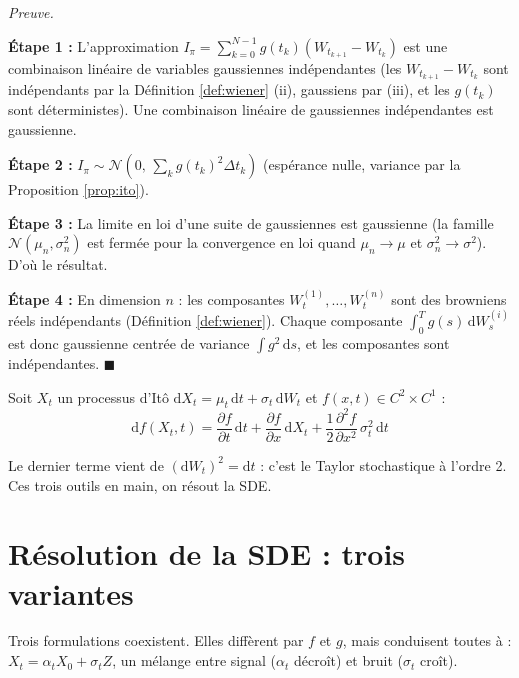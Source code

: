 \documentclass[12pt]{article}
\renewcommand{\qedsymbol}{$\blacksquare$}
\renewenvironment{proof}[1][\proofname]{%
  \par\medskip\noindent
  \textit{\color{proofgray}#1.}\enspace\ignorespaces
}{\hfill\qedsymbol\par\medskip}
\renewcommand{\proofname}{Preuve}
\begin{document}
  \begin{proof}







\textbf{Étape 1 :} L'approximation $I_\pi = \sum_{k=0}^{N-1} g(t_k)(W_{t_{k+1}} - W_{t_k})$ est une combinaison linéaire de variables gaussiennes indépendantes (les $W_{t_{k+1}} - W_{t_k}$ sont indépendants par la Définition \ref{def:wiener} (ii), gaussiens par (iii), et les $g(t_k)$ sont déterministes). Une combinaison linéaire de gaussiennes indépendantes est gaussienne.

\textbf{Étape 2 :} $I_\pi \sim \mathcal{N}(0,\, \sum_k g(t_k)^2 \Delta t_k)$ (espérance nulle, variance par la Proposition \ref{prop:ito}).

\textbf{Étape 3 :} La limite en loi d'une suite de gaussiennes est gaussienne (la famille $\mathcal{N}(\mu_n, \sigma_n^2)$ est fermée pour la convergence en loi quand $\mu_n \to \mu$ et $\sigma_n^2 \to \sigma^2$). D'où le résultat.

\textbf{Étape 4 :} En dimension $n$ : les composantes $W_t^{(1)}, \ldots, W_t^{(n)}$ sont des browniens réels indépendants (Définition \ref{def:wiener}). Chaque composante $\int_0^T g(s)\, \mathrm{d}W_s^{(i)}$ est donc gaussienne centrée de variance $\int g^2\, \mathrm{d}s$, et les composantes sont indépendantes.
\end{proof}

\begin{propositionbox}
\label{prop:itoformula}
Soit $X_t$ un processus d'Itô $\mathrm{d}X_t = \mu_t\,\mathrm{d}t + \sigma_t\,\mathrm{d}W_t$ et $f(x,t) \in C^{2} \times C^{1}$ :
\begin{equation}
    \mathrm{d}f(X_t, t) = \frac{\partial f}{\partial t}\,\mathrm{d}t + \frac{\partial f}{\partial x}\,\mathrm{d}X_t + \frac{1}{2}\frac{\partial^2 f}{\partial x^2}\,\sigma_t^2\,\mathrm{d}t
\end{equation}
\end{propositionbox}

Le dernier terme vient de $(\mathrm{d}W_t)^2 = \mathrm{d}t$ : c'est le Taylor stochastique à l'ordre 2. Ces trois outils en main, on résout la SDE.

\section{Résolution de la SDE : trois variantes}

Trois formulations coexistent. Elles diffèrent par $f$ et $g$, mais conduisent toutes à : $X_t = \alpha_t X_0 + \sigma_t Z$, un mélange entre signal ($\alpha_t$ décroît) et bruit ($\sigma_t$ croît).
\end{document}

